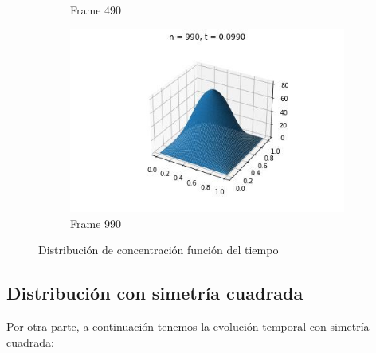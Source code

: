 \documentclass{article}
\begin{document}
\begin{figure} [H]
\begin{subfigure}{0.3\linewidth}
    \caption{Frame 490}
  \end{subfigure}
      \begin{subfigure}{0.3\linewidth}
    \centering
    \includegraphics[width=\linewidth]{Polar/3D/990.jpg}
    \caption{Frame 990}
  \end{subfigure}
  \caption{Distribución de concentración función del tiempo}
  \label{fig:cilindrica3d}
\end{figure}

\subsection{Distribución con simetría cuadrada}
Por otra parte, a continuación tenemos la evolución temporal con simetría cuadrada:
\end{document}

